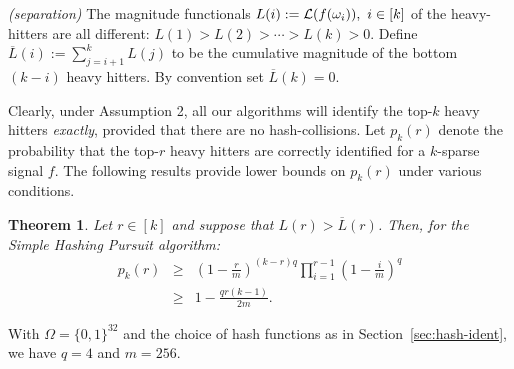 \documentclass[10pt, conference, letterpaper,onecolumn]{IEEEtranv1.8}
\renewcommand\P{\mathbb P}
\theoremstyle{plain}\newtheorem{thm}{Theorem}\newtheorem{lem}{Lemma}
\theoremstyle{definition}
\def\HideProof#1{}
\begin{document}
\smallskip
{} {\em (separation)} The magnitude functionals $L(i):= {\cal L}(f(\omega_i)),\ i\in [k]$ 
of the heavy-hitters are all different:
$
 L (1) >L(2) > \cdots >L(k)> 0. 
$
Define $\overline{L}(i) := \sum_{j=i+1}^k L(j)$ to be the cumulative magnitude of the bottom $(k-i)$ heavy hitters. By convention
set $\overline L(k) = 0.$



\smallskip
  Clearly, under Assumption 2, all our algorithms will identify 
 the top-$k$ heavy hitters {\em exactly}, provided that there are no hash-collisions. Let $p_k(r)$ denote the 
 probability that the top-$r$ heavy hitters are correctly identified for a $k$-sparse signal $f$. The following 
 results provide lower bounds on $p_k(r)$ under various conditions.

\begin{thm} \label{p:simple} Let $r\in[k]$ and suppose that $L(r)>\overline L(r)$. Then, for the Simple Hashing Pursuit algorithm:
\begin{eqnarray}\label{e:b-day}
 p_k(r) &\ge&  \left(1- \frac{r}{m}\right)^{(k-r)q} \prod_{i=1}^{r-1} \left(1-\frac{i}{m}\right)^q    \\
 &\ge& 1 - \frac{q r(k-1)}{2m}.\nonumber 
\end{eqnarray}
\end{thm}
 With $\Omega=\{0,1\}^{32}$ and the choice of hash functions as in Section~\ref{sec:hash-ident}, we have  $q=4$ and $m=256$. 
\HideProof{\begin{proof}
For each hash function $h_j,\ j\in [q]$, let $A_j(r)$ be the event that the top-$r$ heavy hitters are hashed into $r$ different bins,
{\em and} at the same time, the remaining $k-r$ hitters are hashed into the remaining $m-r$ bins. That is, the bins of
the top-$r$ hitters involve no collisions.  By the independence of $h_j(\omega_i),\ i\in [k]$, we have
\begin{equation}\label{e:simple-1}
\P(A_j(r)) = \frac{(m-1)}{m} \cdots \frac{(m-r+1)}{m} \times \left (\frac{m-r}{m}\right)^{k-r}.
\end{equation}
If the event $\cap_{j\in[q]} A_j(r)$ occurs, then the top-$r$ heavy hitters will be correctly identified. Thus, the
independence of the events $A_j(r)$ in $j\in [q]$ implies that 
$$
p_r(k) \ge \P(\cap_{j\in [q]} A_j(r)) = \P(A_j(r))^q, 
$$
which by \eqref{e:b-day} yields the first bound. The second bound follows from 
the {\em product comparison} inequality
$$
|\prod_{i=1}^k a_i - \prod_{i=1}^k b_i |\le \sum_{i=1}^k |a_i - b_i|,
$$
valid for all $a_i,b_i\in[-1,1]$. Indeed, setting $a_i=1$ and $b_i = (m-i\wedge r)/m$, we get
\begin{eqnarray*}
1- \P(A_j(r))^q &\le& q \sum_{i=1}^{r-1}\frac{i}{m} + (k-r)\frac{r}{m} \\
&=& q\frac{ r(r-1) + (k-r)r}{2m},
\end{eqnarray*}
which gives the second bound.
\end{proof}}
\end{document}

